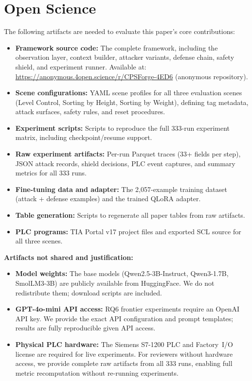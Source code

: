 \documentclass[sigconf,anonymous]{acmart} %
\begin{document}
\appendix

\section{Open Science}
\label{sec:appendix:openscience}

The following artifacts are needed to evaluate this paper's core contributions:

\begin{itemize}[nosep]
  \item \textbf{Framework source code:} The complete framework, including the observation layer, context builder, attacker variants, defense chain, safety shield, and experiment runner. Available at: \url{https://anonymous.4open.science/r/CPSForge-4ED6} (anonymous repository).
  \item \textbf{Scene configurations:} YAML scene profiles for all three evaluation scenes (Level Control, Sorting by Height, Sorting by Weight), defining tag metadata, attack surfaces, safety rules, and reset procedures.
  \item \textbf{Experiment scripts:} Scripts to reproduce the full 333-run experiment matrix, including checkpoint/resume support.
  \item \textbf{Raw experiment artifacts:} Per-run Parquet traces (33+ fields per step), JSON attack records, shield decisions, PLC event captures, and summary metrics for all 333 runs.
  \item \textbf{Fine-tuning data and adapter:} The 2{,}057-example training dataset (attack + defense examples) and the trained QLoRA adapter.
  \item \textbf{Table generation:} Scripts to regenerate all paper tables from raw artifacts.
  \item \textbf{PLC programs:} TIA Portal v17 project files and exported SCL source for all three scenes.
\end{itemize}

\noindent\textbf{Artifacts not shared and justification:}
\begin{itemize}[nosep]
  \item \textbf{Model weights:} The base models (Qwen2.5-3B-Instruct, Qwen3-1.7B, SmolLM3-3B) are publicly available from HuggingFace. We do not redistribute them; download scripts are included.
  \item \textbf{GPT-4o-mini API access:} RQ6 frontier experiments require an OpenAI API key. We provide the exact API configuration and prompt templates; results are fully reproducible given API access.
  \item \textbf{Physical PLC hardware:} The Siemens S7-1200 PLC and Factory~I/O license are required for live experiments. For reviewers without hardware access, we provide complete raw artifacts from all 333 runs, enabling full metric recomputation without re-running experiments.
\end{itemize}
\end{document}
